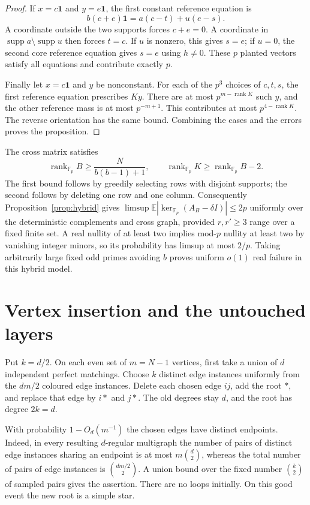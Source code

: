 \documentclass[11pt]{article}
\newcommand{\Fp}{\mathbb F_p}
\newcommand{\one}{\mathbf1}
\newcommand{\rank}{\operatorname{rank}}
\newcommand{\E}{\mathbb E}
\begin{document}
\begin{proof}
If $x=c\one$ and $y=e\one$, the first constant reference equation is
\[
 b(c+e)\one=a(c-t)+u(e-s).
\]
A coordinate outside the two supports forces $c+e=0$. A coordinate
in $\operatorname{supp}a\setminus\operatorname{supp}u$ then forces
$t=c$. If $u$ is nonzero, this gives $s=e$; if $u=0$, the second core
reference equation gives $s=e$ using $h\ne0$. These $p$ planted
vectors satisfy all equations and contribute exactly $p$.

Finally let $x=c\one$ and $y$ be nonconstant. For each of the $p^3$
choices of $c,t,s$, the first reference equation prescribes $Ky$.
There are at most $p^{m-\rank K}$ such $y$, and the other reference
mass is at most $p^{-m+1}$. This contributes at most
$p^{4-\rank K}$. The reverse orientation has the same bound. Combining
the cases and the errors proves the proposition.
\end{proof}

The cross matrix satisfies
\[
 \rank_{\Fp}B\ge\frac{N}{b(b-1)+1},\qquad
 \rank_{\Fp}K\ge\rank_{\Fp}B-2.
\]
The first bound follows by greedily selecting rows with disjoint
supports; the second follows by deleting one row and one column.
Consequently Proposition~\ref{prop:hybrid} gives
$\limsup\E|\ker_{\Fp}(A_B-\delta I)|\le2p$ uniformly over the
deterministic complements and cross graph, provided $r,r'\ge3$ range
over a fixed finite set. A real nullity of at least two implies mod-$p$
nullity at least two by vanishing integer minors, so its probability has
limsup at most $2/p$. Taking arbitrarily large fixed odd primes avoiding
$b$ proves uniform $o(1)$ real failure in this hybrid model.

\section{Vertex insertion and the untouched layers}
Put $k=d/2$. On each even set of $m=N-1$ vertices, first take a union
of $d$ independent perfect matchings. Choose $k$ distinct edge
instances uniformly from the $dm/2$ coloured edge instances. Delete
each chosen edge $ij$, add the root $*$, and replace that edge by
$i*$ and $j*$. The old degrees stay $d$, and the root has degree $2k=d$.

With probability $1-O_d(m^{-1})$ the chosen edges have distinct
endpoints. Indeed, in every resulting $d$-regular multigraph the number
of pairs of distinct edge instances sharing an endpoint is at most
$m\binom d2$, whereas the total number of pairs of edge instances is
$\binom{dm/2}{2}$. A union bound over the fixed number $\binom k2$
of sampled pairs gives the assertion. There are no loops initially.
On this good event the new root is a simple star.
\end{document}
